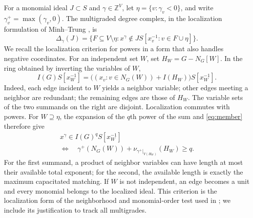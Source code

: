 \documentclass[11pt,a4paper]{article}
\theoremstyle{definition}
\newcommand{\ZZ}{\mathbb Z}
\begin{document}
For a monomial ideal $J\subset S$ and $\gamma\in\ZZ^V$, let $\eta=\{v:\gamma_v<0\}$, and write $\gamma^+_v=\max(\gamma_v,0)$. The multigraded degree complex, in the localization formulation of Minh--Trung \cite[Lemma 1.2]{MT}, is
\begin{equation}\label{eq:degree-def}
 \Delta_\gamma(J)=\{F\subseteq V\setminus\eta:
 x^\gamma\notin J S[x_v^{-1}:v\in F\cup\eta]\}.
\end{equation}
We recall the localization criterion for powers in a form that also handles negative coordinates. For an independent set $W$, set $H_W=G-N_G[W]$. In the ring obtained by inverting the variables of $W$,
\[
 I(G)S[x_W^{-1}]=\bigl((x_v:v\in N_G(W))+I(H_W)\bigr)S[x_W^{-1}].
\]
Indeed, each edge incident to $W$ yields a neighbor variable; other edges meeting a neighbor are redundant; the remaining edges are those of $H_W$. The variable sets of the two summands on the right are disjoint. Localization commutes with powers. For $W\supseteq\eta$, the expansion of the $q$th power of the sum and \eqref{eq:member} therefore give
\begin{equation}\label{eq:criterion}
 \begin{gathered}
 x^\gamma\in I(G)^q S[x_W^{-1}]\\
 \Longleftrightarrow\quad
 \gamma^+(N_G(W))+\nu_{\gamma^+|_{V(H_W)}}(H_W)\geq q.
 \end{gathered}
\end{equation}
For the first summand, a product of neighbor variables can have length at most their available total exponent; for the second, the available length is exactly the maximum capacitated matching. If $W$ is not independent, an edge becomes a unit and every monomial belongs to the localized ideal. This criterion is the localization form of the neighborhood and monomial-order test used in \cite[Lemma 2.22]{MV}; we include its justification to track all multigrades.
\end{document}
